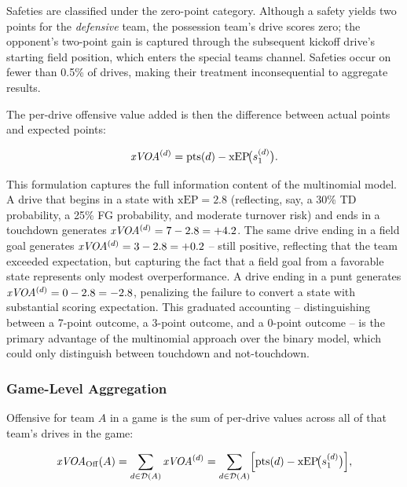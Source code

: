 Safeties are classified under the zero-point category. Although a safety
yields two points for the \emph{defensive} team, the possession team's drive
scores zero; the opponent's two-point gain is captured through the subsequent
kickoff drive's starting field position, which enters the special teams
channel. Safeties occur on fewer than 0.5\% of drives, making their treatment
inconsequential to aggregate results.

The per-drive offensive value added is then the difference between actual
points and expected points:

\begin{equation}
  \label{eq:xvoa-drive}
  \textit{xVOA}{}^{(d)} = \mathrm{pts}(d) - \mathrm{xEP}\!\bigl(s_1^{(d)}\bigr).
\end{equation}

This formulation captures the full information content of the multinomial
model. A drive that begins in a state with $\mathrm{xEP} = 2.8$ (reflecting,
say, a 30\% TD probability, a 25\% FG probability, and moderate turnover risk)
and ends in a touchdown generates $\textit{xVOA}{}^{(d)} = 7 - 2.8 = +4.2$. The same
drive ending in a field goal generates $\textit{xVOA}{}^{(d)} = 3 - 2.8 = +0.2$ -- still
positive, reflecting that the team exceeded expectation, but capturing the
fact that a field goal from a favorable state represents only modest
overperformance. A drive ending in a punt generates $\textit{xVOA}{}^{(d)} = 0 - 2.8
= -2.8$, penalizing the failure to convert a state with substantial scoring
expectation. This graduated accounting -- distinguishing between a 7-point
outcome, a 3-point outcome, and a 0-point outcome -- is the primary advantage
of the multinomial approach over the binary model, which could only distinguish
between touchdown and not-touchdown.

\subsubsection{Game-Level Aggregation}

Offensive \xvoa{} for team $A$ in a game is the sum of per-drive values
across all of that team's drives in the game:

\begin{equation}
  \label{eq:xvoa-off}
  \textit{xVOA}{}_{\mathrm{Off}}(A) = \sum_{d \in \mathcal{D}(A)} \textit{xVOA}{}^{(d)}
    = \sum_{d \in \mathcal{D}(A)}
      \Bigl[\mathrm{pts}(d) - \mathrm{xEP}\!\bigl(s_{1}^{(d)}\bigr)\Bigr],
\end{equation}

